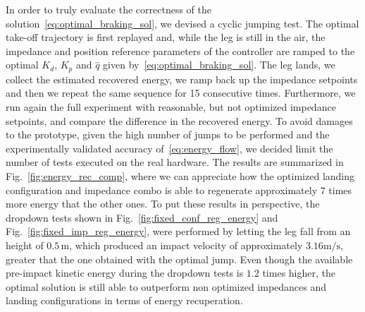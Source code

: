 In order to truly evaluate the correctness of the solution~\eqref{eq:optimal_braking_sol}, we devised a cyclic jumping test. The optimal take-off trajectory is first replayed and, while the leg is still in the air, the impedance and position reference parameters of the controller are ramped to the optimal $K_d$, $K_p$ and $\hat{q}$ given by~\eqref{eq:optimal_braking_sol}. The leg lands, we collect the estimated recovered energy, we ramp back up the impedance setpoints and then we repeat the same sequence for 15 consecutive times. Furthermore, we run again the full experiment with reasonable, but not optimized impedance setpoints, and compare the difference in the recovered energy. To avoid damages to the prototype, given the high number of jumps to be performed and the experimentally validated accuracy of~\eqref{eq:energy_flow}, we decided limit the number of tests executed on the real hardware. The results are summarized in Fig.~\ref{fig:energy_rec_comp}, where we can appreciate how the optimized landing configuration and impedance combo is able to regenerate approximately $7$ times more energy that the other ones. To put these results in perspective, the dropdown tests shown in Fig.~\ref{fig:fixed_conf_reg_energy} and Fig.~\ref{fig:fixed_imp_reg_energy}, were performed by letting the leg fall from an height of $0.5\,\mathrm{m}$, which produced an impact velocity of approximately $3.16\mathrm{m/s}$, greater that the one obtained with the optimal jump. Even though the available pre-impact kinetic energy during the dropdown tests is $1.2$ times higher, the optimal solution is still able to outperform non optimized impedances and landing configurations in terms of energy recuperation.